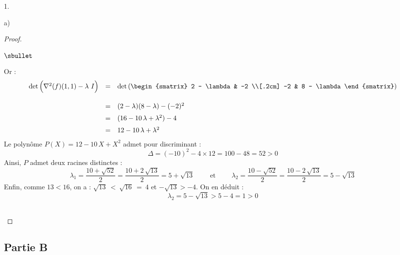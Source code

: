 \documentclass[11pt]{article}%
\begin{document}
\begin{noliste}{1.}
\begin{noliste}{a)}
\begin{proof}
      \begin{noliste}{$\sbullet$}
      \item Or :
        \[
        \begin{array}{rcl}
          \det\Big(\nabla^2(f)(1, 1) - \lambda \ I\Big) & = & \det\left( 
            \begin{smatrix}
              2 - \lambda & -2 \\[.2cm]
              -2 & 8 - \lambda
            \end{smatrix} 
          \right)
          \\[.6cm]
          & = & (2 - \lambda)(8 - \lambda) - (-2)^2
          \\[.2cm]
          & = & (16 - 10 \, \lambda + \lambda^2) - 4
          \\[.2cm]
          & = & 12 - 10 \, \lambda + \lambda^2
        \end{array}
        \]
        Le polynôme $P(X) = 12 - 10 \, X + X^2$ admet pour
        discriminant :
        \[
        \Delta = (-10)^2 - 4 \times 12 = 100 - 48 = 52 > 0
        \]
        Ainsi, $P$ admet deux racines distinctes :
        \[
        \lambda_1 = \dfrac{10 + \sqrt{52}}{2} = \dfrac{10 + 2 \,
          \sqrt{13}}{2} = 5 + \sqrt{13} \qquad \text{ et } \qquad
        \lambda_2 = \dfrac{10 - \sqrt{52}}{2} = \dfrac{10 - 2 \,
          \sqrt{13}}{2} = 5 - \sqrt{13}
        \]        
        Enfin, comme $13 < 16$, on a : $\sqrt{13} \ < \ \sqrt{16} \ =
        \ 4$ et $-\sqrt{13} > -4$. On en déduit :
        \[
        \lambda_2 = 5 - \sqrt{13} > 5-4 = 1 > 0
        \]
        ~\\[-1.4cm]
      \end{noliste}
    \end{proof}
  \end{noliste}
\end{noliste}

\subsection*{Partie B} 
\end{document}
